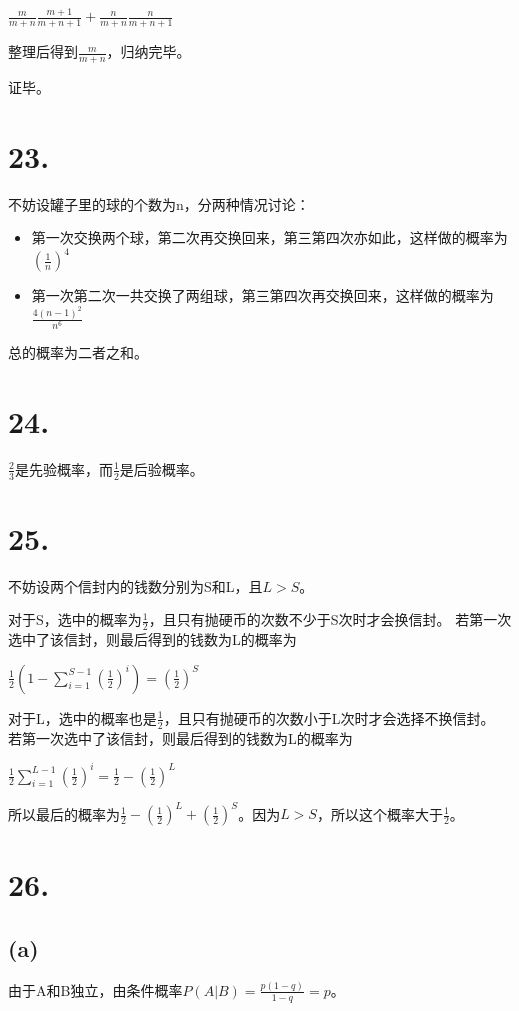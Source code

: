 \documentclass[UTF8]{report}
\begin{document}
        $\frac{m}{m + n}\frac{m + 1}{m + n + 1} + \frac{n}{m + n}\frac{n}{m + n + 1}$

        整理后得到$\frac{m}{m + n}$，归纳完毕。

        证毕。
    \section*{23.}
        不妨设罐子里的球的个数为n，分两种情况讨论：
        \begin{itemize}
            \item 第一次交换两个球，第二次再交换回来，第三第四次亦如此，这样做的概率为$(\frac{1}{n})^4$
            \item 第一次第二次一共交换了两组球，第三第四次再交换回来，这样做的概率为$\frac{4(n - 1)^2}{n^6}$
        \end{itemize}
        总的概率为二者之和。
    \section*{24.}
        $\frac{2}{3}$是先验概率，而$\frac{1}{2}$是后验概率。
    \section*{25.}
        不妨设两个信封内的钱数分别为S和L，且$L > S$。

        对于S，选中的概率为$\frac{1}{2}$，且只有抛硬币的次数不少于S次时才会换信封。
        若第一次选中了该信封，则最后得到的钱数为L的概率为

        $\frac{1}{2}(1 - \sum_{i = 1}^{S - 1}(\frac{1}{2})^i) = (\frac{1}{2})^S$

        对于L，选中的概率也是$\frac{1}{2}$，且只有抛硬币的次数小于L次时才会选择不换信封。
        若第一次选中了该信封，则最后得到的钱数为L的概率为

        $\frac{1}{2}\sum_{i = 1}^{L - 1}(\frac{1}{2})^i = \frac{1}{2} - (\frac{1}{2})^L$

        所以最后的概率为$\frac{1}{2} - (\frac{1}{2})^L + (\frac{1}{2})^S$。因为$L > S$，所以这个概率大于$\frac{1}{2}$。
    \section*{26.}
        \subsection*{(a)}
            由于A和B独立，由条件概率$P(A|B) = \frac{p(1 - q)}{1 -q} = p$。
\end{document}
